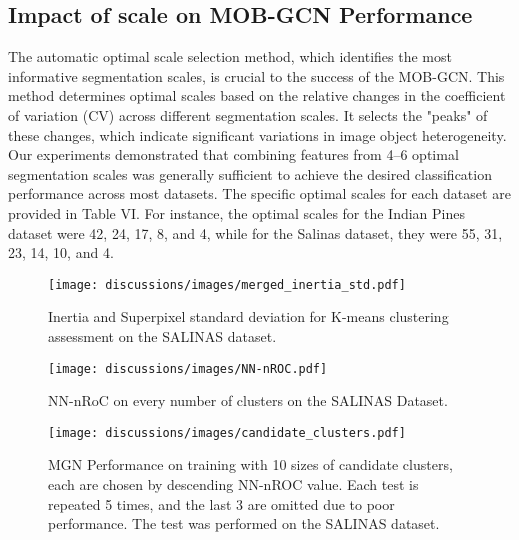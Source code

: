 \subsection{Impact of scale on MOB-GCN Performance}

The automatic optimal scale selection method, which identifies the most informative segmentation scales, is crucial to the success of the MOB-GCN. This method determines optimal scales based on the relative changes in the coefficient of variation (CV) across different segmentation scales. It selects the "peaks" of these changes, which indicate significant variations in image object heterogeneity. Our experiments demonstrated that combining features from 4–6 optimal segmentation scales was generally sufficient to achieve the desired classification performance across most datasets. The specific optimal scales for each dataset are provided in Table VI. For instance, the optimal scales for the Indian Pines dataset were 42, 24, 17, 8, and 4, while for the Salinas dataset, they were 55, 31, 23, 14, 10, and 4.

\begin{figure}[h!]
    \centering
    \texttt{[image: discussions/images/merged\_inertia\_std.pdf]}
    \caption{Inertia and Superpixel standard deviation for K-means clustering assessment on the SALINAS dataset.}
    \label{fig:inertia_standard_deviation}
\end{figure}

\begin{figure}[h!]
    \centering
    \texttt{[image: discussions/images/NN-nROC.pdf]}
    \caption{NN-nRoC on every number of clusters on the SALINAS Dataset.
}
    \label{fig:nn_nRoC}
\end{figure}

\begin{figure}[h!]
    \centering
    \texttt{[image: discussions/images/candidate\_clusters.pdf]}
    \caption{MGN Performance on training with 10 sizes of candidate clusters, each are chosen by descending NN-nROC value. Each test is repeated 5 times, and the last 3 are omitted due to poor performance. The test was performed on the SALINAS dataset.}
    \label{fig:candidate_size}
\end{figure}

